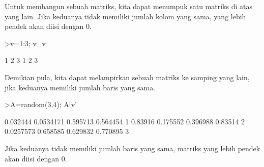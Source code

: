 \documentclass[a4paper,10pt]{article}
\begin{document}
\begin{eulernotebook}
\begin{eulercomment}
\begin{eulercomment}
\begin{eulercomment}
\begin{eulercomment}
\begin{eulercomment}
Untuk membangun sebuah matriks, kita dapat menumpuk satu matriks di
atas yang lain. Jika keduanya tidak memiliki jumlah kolom yang sama,
yang lebih pendek akan diisi dengan 0.
\end{eulercomment}
\begin{eulerprompt}
>v=1:3; v_v
\end{eulerprompt}
\begin{euleroutput}
              1             2             3 
              1             2             3 
\end{euleroutput}
\begin{eulercomment}
Demikian pula, kita dapat melampirkan sebuah matriks ke samping yang
lain, jika keduanya memiliki jumlah baris yang sama.
\end{eulercomment}
\begin{eulerprompt}
>A=random(3,4); A|v'
\end{eulerprompt}
\begin{euleroutput}
       0.032444     0.0534171      0.595713      0.564454             1 
        0.83916      0.175552      0.396988       0.83514             2 
      0.0257573      0.658585      0.629832      0.770895             3 
\end{euleroutput}
\begin{eulercomment}
Jika keduanya tidak memiliki jumlah baris yang sama, matriks yang
lebih pendek akan diisi dengan 0.


\end{eulercomment}
\end{eulercomment}
\end{eulercomment}
\end{eulercomment}
\end{eulercomment}
\end{eulernotebook}
\end{document}

